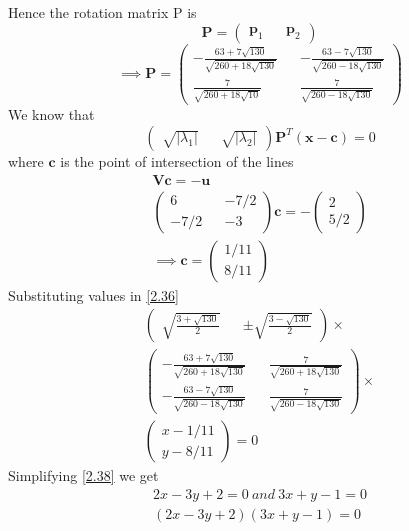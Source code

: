 \documentclass[journal,13pt,twocolumn]{IEEEtran}
\newcommand{\myvec}[1]{\ensuremath{\begin{pmatrix}#1\end{pmatrix}}}
\renewcommand{\vec}[1]{\mathbf{#1}}
\begin{document}
Hence the rotation matrix P is
\begin{equation} \label{2.34}
\vec{P} = \myvec{\vec{p}_1 && \vec{p}_2}
\end{equation}
\begin{equation} \label{2.35}
\implies \vec{P} = \myvec{-\frac{63+7\sqrt{130}}{\sqrt{260+18\sqrt{130}}} && -\frac{63-7\sqrt{130}}{\sqrt{260-18\sqrt{130}}} \\ \frac{7}{\sqrt{260+18\sqrt{10}}} && \frac{7}{\sqrt{260-18\sqrt{130}}}}
\end{equation}
We know that 
\begin{equation}\label{2.36}
\myvec{\sqrt{|\lambda_1|} && \sqrt{|\lambda_2|}}\vec{P}^T(\vec{x}-\vec{c}) = 0
\end{equation}
where $\vec{c}$ is the point of intersection of the lines 
\begin{equation} \label{2.37}
\begin{split}
\vec{V}\vec{c} = -\vec{u}\\
\myvec{6 && -7/2\\-7/2 && -3} \vec{c} = -\myvec{2 \\ 5/2}\\
\implies \vec{c} = \myvec{1/11 \\ 8/11}
\end{split}
\end{equation}
Substituting values in \eqref{2.36}
\begin{equation} \label{2.38}
\begin{split}
\myvec{ \sqrt{\frac{3+\sqrt{130}}{2}} && \pm\sqrt{\frac{3-\sqrt{130}}{2}}} \times \\
\myvec{ -\frac{63+7\sqrt{130}}{\sqrt{260+18\sqrt{130}}} && \frac{7}{\sqrt{260+18\sqrt{130}}} \\ -\frac{63-7\sqrt{130}}{\sqrt{260-18\sqrt{130}}} && \frac{7}{\sqrt{260-18\sqrt{130}}}} \times \\
\myvec{x-1/11 \\ y-8/11} = 0
\end{split}
\end{equation}
Simplifying \eqref{2.38} we get 
\begin{equation} \label{2.39}
\begin{split}
2x - 3y + 2 = 0~ and ~3x + y - 1 = 0\\
\boxed{(2x - 3y + 2)(3x + y - 1) = 0}
\end{split}
\end{equation}
\end{document}
